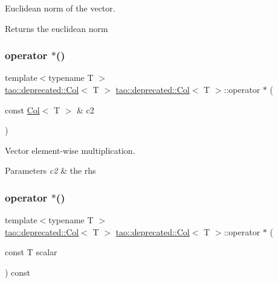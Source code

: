 Euclidean norm of the vector. 

\begin{DoxyReturn}{Returns}
the euclidean norm 
\end{DoxyReturn}
\mbox{\label{classtao_1_1deprecated_1_1_col_ac84032af63de62d7a14fe6c1e85c8251}} 
\subsubsection{\texorpdfstring{operator $\ast$()}{operator *()}\hspace{0.1cm}{\footnotesize\ttfamily [1/2]}}
{\footnotesize\ttfamily template$<$typename T $>$ \\
\mbox{\hyperlink{classtao_1_1deprecated_1_1_col}{tao\+::deprecated\+::\+Col}}$<$ T $>$ \mbox{\hyperlink{classtao_1_1deprecated_1_1_col}{tao\+::deprecated\+::\+Col}}$<$ T $>$\+::operator $\ast$ (\begin{DoxyParamCaption}\item[{const \mbox{\hyperlink{classtao_1_1deprecated_1_1_col}{Col}}$<$ T $>$ \&}]{c2 }\end{DoxyParamCaption})}



Vector element-\/wise multiplication. 


\begin{DoxyParams}{Parameters}
{\em c2} & the rhs \\
\hline
\end{DoxyParams}
\mbox{\label{classtao_1_1deprecated_1_1_col_aa5aaea7c660cbe4423f3656544d6a295}} 
\subsubsection{\texorpdfstring{operator $\ast$()}{operator *()}\hspace{0.1cm}{\footnotesize\ttfamily [2/2]}}
{\footnotesize\ttfamily template$<$typename T $>$ \\
\mbox{\hyperlink{classtao_1_1deprecated_1_1_col}{tao\+::deprecated\+::\+Col}}$<$ T $>$ \mbox{\hyperlink{classtao_1_1deprecated_1_1_col}{tao\+::deprecated\+::\+Col}}$<$ T $>$\+::operator $\ast$ (\begin{DoxyParamCaption}\item[{const T}]{scalar }\end{DoxyParamCaption}) const}



